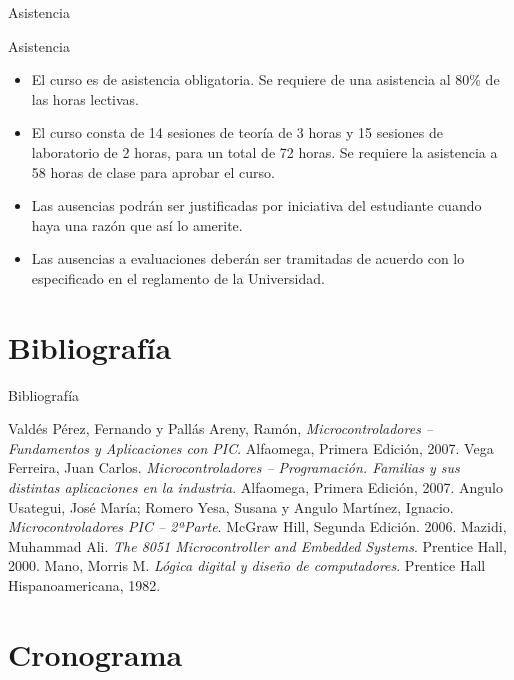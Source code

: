 \documentclass[xcolor=dvipsnames,handout]{beamer}
\newcommand{\pageframe}[1]{\frame{\begin{center}{ \Huge #1 }\end{center}}}
\begin{document}
\begin{frame}{Asistencia}
\begin{block}{Asistencia}
  \begin{itemize}[<+->]
    \item El curso es de asistencia obligatoria. Se requiere de una asistencia al 80\% de las horas lectivas.
    \item El curso consta de 14 sesiones de teoría de 3 horas y 15 sesiones de laboratorio de 2 horas, para un total de 72 horas. Se requiere la asistencia a 58 horas de clase para aprobar el curso.
    \item Las ausencias podrán ser justificadas por iniciativa del estudiante cuando haya una razón que así lo amerite.
    \item Las ausencias a evaluaciones deberán ser tramitadas de acuerdo con lo especificado en el reglamento de la Universidad.
  \end{itemize}
\end{block}
\end{frame}

\section{Bibliografía}

\pageframe{Bibliografía}
\nocite{*}

\begin{frame}{Bibliografía}

\begin{thebibliography}{5}
  Valdés Pérez, Fernando y Pallás Areny, Ramón,
  \textit{Microcontroladores -- Fundamentos y Aplicaciones con PIC}.
  Alfaomega,
  Primera Edición,
  2007.
  Vega Ferreira, Juan Carlos.
  \textit{Microcontroladores -- Programación. Familias y sus distintas aplicaciones en la industria}.
  Alfaomega,
  Primera Edición,
  2007.
  Angulo Usategui, José María; Romero Yesa, Susana y Angulo Martínez, Ignacio.
  \textit{Microcontroladores PIC -- 2ªParte}.
  McGraw Hill,
  Segunda Edición.
  2006.
  Mazidi, Muhammad Ali.
  \textit{The 8051 Microcontroller and Embedded Systems}.
  Prentice Hall,
  2000.
  Mano, Morris M.
  \textit{Lógica digital y diseño de computadores}.
  Prentice Hall Hispanoamericana,
  1982.
\end{thebibliography}

\end{frame}

\section{Cronograma}
\end{document}
